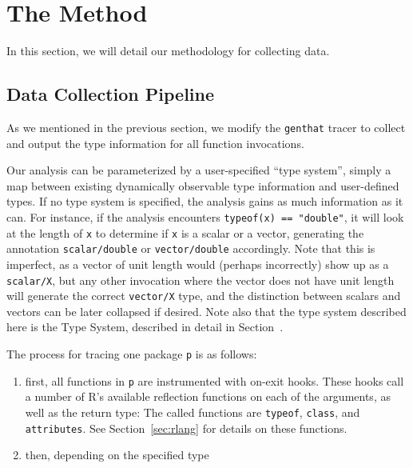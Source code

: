 \documentclass[acmsmall,10pt,review,anonymous]{acmart}\settopmatter{printfolios=true,printccs=false,printacmref=false}
\begin{document}


\section{The Method}

In this section, we will detail our methodology for collecting data.

%
%
%
%
\subsection{Data Collection Pipeline}

As we mentioned in the previous section, we modify the {\tt genthat} tracer to collect and output the type information for all function invocations.

Our analysis can be parameterized by a user-specified ``type system'', simply a map between existing dynamically observable type information and user-defined types.
If no type system is specified, the analysis gains as much information as it can.
For instance, if the analysis encounters {\tt typeof(x) == "double"}, it will look at the length of {\tt x} to determine if {\tt x} is a scalar or a vector, generating the annotation {\tt scalar/double} or {\tt vector/double} accordingly.
Note that this is imperfect, as a vector of unit length would (perhaps incorrectly) show up as a {\tt scalar/X}, but any other invocation where the vector does not have unit length will generate the correct {\tt vector/X} type, and the distinction between scalars and vectors can be later collapsed if desired.
Note also that the type system described here is the  Type System, described in detail in Section~.

The process for tracing one package {\tt p} is as follows:

\begin{enumerate}

	\item first, all functions in {\tt p} are instrumented with on-exit hooks.
	These hooks call a number of R's available reflection functions on each of the arguments, as well as the return type:
	The called functions are {\tt typeof}, {\tt class}, and {\tt attributes}.
	See Section~\ref{sec:rlang} for details on these functions.
	
	\item then, depending on the specified type 

\end{enumerate}
\end{document}
